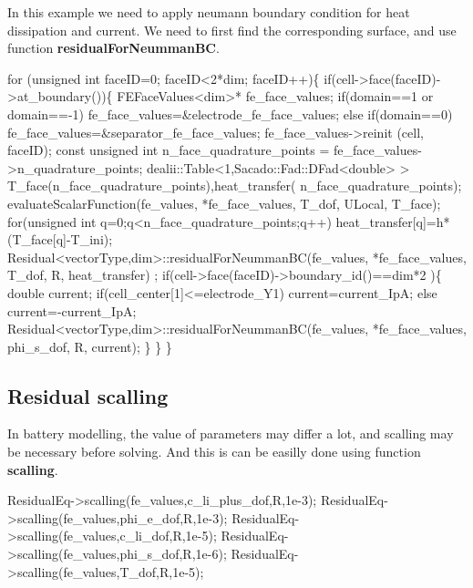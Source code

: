 In this example we need to apply neumann boundary condition for heat dissipation and current. We need to first find the corresponding surface, and use function {\bfseries residual\+For\+Neumman\+BC}. 
\begin{DoxyCode}
\textcolor{keywordflow}{for} (\textcolor{keywordtype}{unsigned} \textcolor{keywordtype}{int} faceID=0; faceID<2*dim; faceID++)\{
    \textcolor{keywordflow}{if}(cell->face(faceID)->at\_boundary())\{
        FEFaceValues<dim>* fe\_face\_values;
        \textcolor{keywordflow}{if}(domain==1 or domain==-1) fe\_face\_values=&electrode\_fe\_face\_values;
        \textcolor{keywordflow}{else} \textcolor{keywordflow}{if}(domain==0) fe\_face\_values=&separator\_fe\_face\_values;
        fe\_face\_values->reinit (cell, faceID);
        \textcolor{keyword}{const} \textcolor{keywordtype}{unsigned} \textcolor{keywordtype}{int} n\_face\_quadrature\_points = fe\_face\_values->n\_quadrature\_points;
        dealii::Table<1,Sacado::Fad::DFad<double> > T\_face(n\_face\_quadrature\_points),heat\_transfer(
      n\_face\_quadrature\_points);
        evaluateScalarFunction(fe\_values, *fe\_face\_values, T\_dof, ULocal, T\_face);
        \textcolor{keywordflow}{for}(\textcolor{keywordtype}{unsigned} \textcolor{keywordtype}{int} q=0;q<n\_face\_quadrature\_points;q++) heat\_transfer[q]=h*(T\_face[q]-T\_ini);
        Residual<vectorType,dim>::residualForNeummanBC(fe\_values, *fe\_face\_values, T\_dof, R, heat\_transfer)
      ;
        \textcolor{keywordflow}{if}(cell->face(faceID)->boundary\_id()==dim*2 )\{
            \textcolor{keywordtype}{double} current;
            \textcolor{keywordflow}{if}(cell\_center[1]<=electrode\_Y1) current=current\_IpA;
            \textcolor{keywordflow}{else} current=-current\_IpA;
            Residual<vectorType,dim>::residualForNeummanBC(fe\_values, *fe\_face\_values, phi\_s\_dof, R, 
      current);
        \}
    \}
\}   
\end{DoxyCode}
 \hypertarget{battery_electrode_scale_Scalling}{}\subsection{Residual scalling}\label{battery_electrode_scale_Scalling}
In battery modelling, the value of parameters may differ a lot, and scalling may be necessary before solving. And this is can be easilly done using function {\bfseries scalling}. 
\begin{DoxyCode}
ResidualEq->scalling(fe\_values,c\_li\_plus\_dof,R,1e-3);
ResidualEq->scalling(fe\_values,phi\_e\_dof,R,1e-3);
ResidualEq->scalling(fe\_values,c\_li\_dof,R,1e-5);
ResidualEq->scalling(fe\_values,phi\_s\_dof,R,1e-6);
ResidualEq->scalling(fe\_values,T\_dof,R,1e-5);
\end{DoxyCode}
